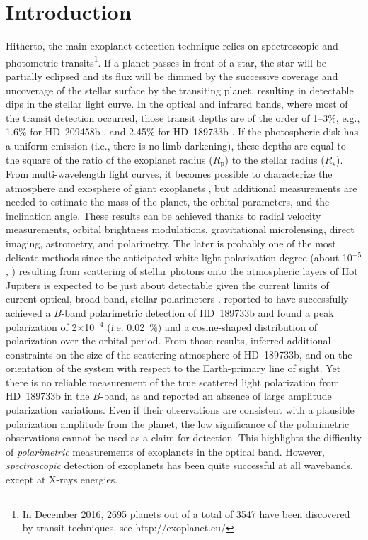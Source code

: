 \documentclass[iop]{emulateapj}
\begin{document}
\section{Introduction}
\label{Intro}

Hitherto, the main exoplanet detection technique relies on spectroscopic and photometric transits\footnote{In December 2016, 2695 
planets out of a total of 3547 have been discovered by transit techniques, see http://exoplanet.eu/}. If a planet passes in front of a star, 
the star will be partially eclipsed and its flux will be dimmed by the successive coverage and uncoverage of the stellar surface by the transiting 
planet, resulting in detectable dips in the stellar light curve. In the optical and infrared bands, where most of the transit detection 
occurred, those transit depths are of the order of 1--3\%, e.g., 1.6\% for HD~209458b \citep{Charbonneau2000,Brown2001}, and 2.45\% for 
HD~189733b \citep{Lecavelier2008,Bouchy2005}. If the photospheric disk has a uniform emission (i.e., there is no limb-darkening), these depths
are equal to the square of the ratio of the exoplanet radius ($R_\mathrm{p}$) to the stellar radius ($R_\star$). From multi-wavelength 
light curves, it becomes possible to characterize the atmosphere and exosphere of giant exoplanets \citep[e.g.,][]{Redfield2008},
but additional measurements are needed to estimate the mass of the planet, the orbital parameters, and the inclination angle. These results
can be achieved thanks to radial velocity measurements, orbital brightness modulations, gravitational microlensing, direct imaging, astrometry, 
and polarimetry. The later is probably one of the most delicate methods since the anticipated white light polarization degree (about 10$^{-5}$, 
\citealt{Carciofi2005,Kostogryz2014,Kopparla2016}) resulting from scattering of stellar photons onto the atmospheric layers of Hot Jupiters is 
expected to be just about detectable given the current limits of current optical, broad-band, stellar polarimeters \citep{Schmid2005,Hough2006,Wiktorowicz2009}. 
\citet{Berdyugina2008,Berdyugina2011} reported to have successfully achieved a $B$-band polarimetric detection of HD~189733b and found a peak
polarization of 2$\times$10$^{-4}$ (i.e. 0.02~\%) and a cosine-shaped distribution of polarization over the orbital period. From those results, 
\citet{Berdyugina2008} inferred additional constraints on the size of the scattering atmosphere of HD~189733b, and on the orientation of the 
system with respect to the Earth-primary line of sight. Yet there is no reliable measurement of the true scattered light polarization 
from HD~189733b in the $B$-band, as \citet{Wiktorowicz2015} and \citet{Bott2016} reported an absence of large amplitude polarization 
variations. Even if their observations are consistent with a plausible polarization amplitude from the planet, the low significance of the 
polarimetric observations cannot be used as a claim for detection. This highlights the difficulty of \textit{polarimetric} measurements 
of exoplanets in the optical band. However, \textit{spectroscopic} detection of exoplanets has been quite successful at all wavebands, 
except at X-rays energies.
\end{document}
